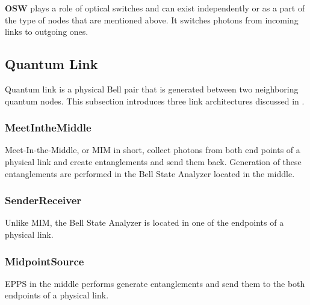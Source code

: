 \textbf{OSW} plays a role of optical switches and can exist independently or as a part of the type of nodes that are mentioned above.
It switches photons from incoming links to outgoing ones.

\subsection{Quantum Link}
Quantum link is a physical Bell pair that is generated between two neighboring quantum nodes.  This subsection introduces three link architectures discussed in \cite{jones2016design}.

\subsubsection{MeetIntheMiddle}

Meet-In-the-Middle, or MIM in short, collect photons from both end points of a physical link and create entanglements and send them back. Generation of these entanglements are performed in the Bell State Analyzer located in the middle.

\subsubsection{SenderReceiver}

Unlike MIM, the Bell State Analyzer is located in one of the endpoints of a physical link.

\subsubsection{MidpointSource}

EPPS in the middle performs generate entanglements and send them to the both endpoints of a physical link.


